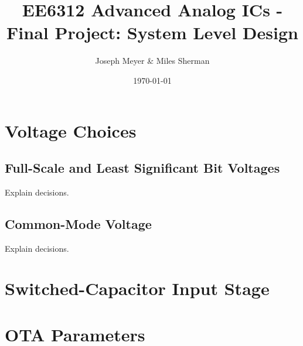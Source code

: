 \documentclass{article}
\begin{document}
\title{EE6312 Advanced Analog ICs - Final Project: System Level Design}
\author{Joseph Meyer \& Miles Sherman}
\date{\today}
\maketitle

\section{Voltage Choices}
\subsection{Full-Scale and Least Significant Bit Voltages}
Explain decisions.

\subsection{Common-Mode Voltage}
Explain decisions.

\section{Switched-Capacitor Input Stage}

\section{OTA Parameters}



%
\end{document}
